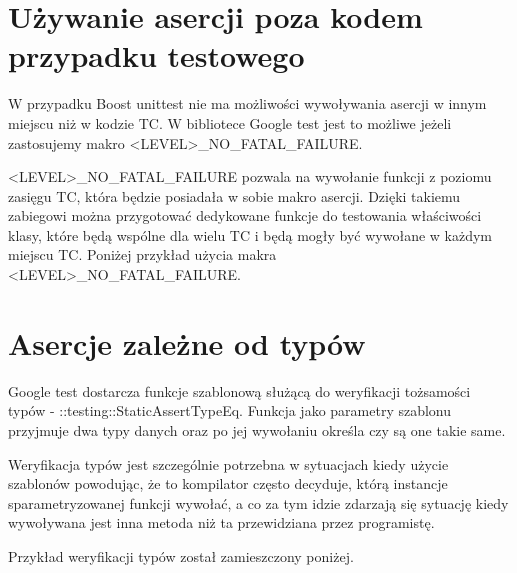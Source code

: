 \documentclass[12pt,a4paper,notitlepage]{report}
\begin{document}
\section{Używanie asercji poza kodem przypadku testowego}

W przypadku Boost unittest nie ma możliwości wywoływania asercji w innym miejscu niż w kodzie TC. W bibliotece Google test jest to możliwe jeżeli zastosujemy makro <LEVEL>{\_}NO{\_}FATAL{\_}FAILURE.

<LEVEL>{\_}NO{\_}FATAL{\_}FAILURE pozwala na wywołanie funkcji z poziomu zasięgu TC, która będzie posiadała w sobie makro asercji. Dzięki takiemu zabiegowi można przygotować dedykowane funkcje do testowania właściwości klasy, które będą wspólne dla wielu TC i będą mogły być wywołane w każdym miejscu TC. Poniżej przykład użycia makra <LEVEL>{\_}NO{\_}FATAL{\_}FAILURE.

			

\section{Asercje zależne od typów}

Google test dostarcza funkcje szablonową służącą do weryfikacji tożsamości typów - ::testing::StaticAssertTypeEq. Funkcja jako parametry szablonu przyjmuje dwa typy danych oraz po jej wywołaniu określa czy są one takie same.

Weryfikacja typów jest szczególnie potrzebna w sytuacjach kiedy użycie szablonów powodując, że to kompilator często decyduje, którą instancje sparametryzowanej funkcji wywołać, a co za tym idzie zdarzają się sytuację kiedy wywoływana jest inna metoda niż ta przewidziana przez programistę.

Przykład weryfikacji typów został zamieszczony poniżej.

			
\end{document}
